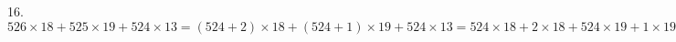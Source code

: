 16. $526\times18+525\times19+524\times13=(524+2)\times18+(524+1)\times19+524\times13=524\times18+2\times18+524\times19+1\times19+524\times13=524\times(18+19+13)+36+19=
524\times50+55=26255.$\\
